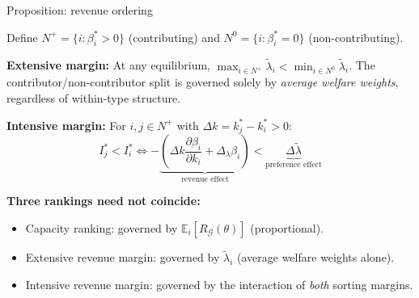 \documentclass[10pt, aspectratio=169]{beamer}
\newcommand{\E}{\mathbb{E}}
\newcommand{\G}{\mathcal{G}}
\begin{document}
\begin{frame}{Proposition: revenue ordering}
\begin{theorem}
Define $N^+ = \{i : \beta_i^\ast > 0\}$ (contributing) and $N^0 = \{i : \beta_i^\ast = 0\}$ (non-contributing).

\textbf{Extensive margin:} At any equilibrium, $\max_{i \in N^+} \tilde\lambda_i < \min_{i \in N^0} \tilde\lambda_i$. The contributor/non-contributor split is governed solely by \emph{average welfare weights}, regardless of within-type structure.

\textbf{Intensive margin:} For $i, j \in N^+$ with $\Delta k = k_j^\ast - k_i^\ast > 0$:
\[ I_j^\ast < I_i^\ast \iff -\underbrace{\left(\Delta k \frac{\partial \beta_i}{\partial k_i} + \Delta_\lambda \beta_i\right)}_{\text{revenue effect}} < \underbrace{\Delta\tilde\lambda}_{\text{preference effect}} \]
\end{theorem}
\vspace{0.1cm}
\textbf{Three rankings need not coincide:}
\begin{itemize}
\item Capacity ranking: governed by $\E_i[R_\G(\theta)]$ (proportional).
\item Extensive revenue margin: governed by $\tilde\lambda_i$ (average welfare weights alone).
\item Intensive revenue margin: governed by the interaction of \emph{both} sorting margins.
\end{itemize}
\end{frame}
\end{document}
